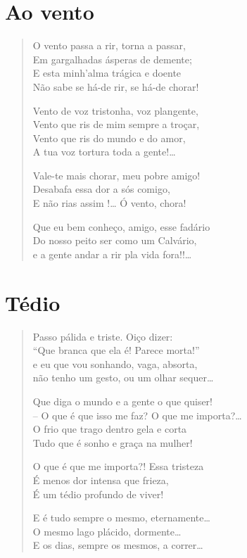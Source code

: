 \chapter{Ao vento}
\begin{verse}
O vento passa a rir, torna a passar,\\
Em gargalhadas ásperas de demente;\\
E esta minh’alma trágica e doente\\
Não sabe se há-de rir, se há-de chorar! 

Vento de voz tristonha, voz plangente,\\
Vento que ris de mim sempre a troçar,\\
Vento que ris do mundo e do amor,\\
A tua voz tortura toda a gente!\ldots{}

Vale-te mais chorar, meu pobre amigo!\\
Desabafa essa dor a sós comigo,\\
E não rias assim !\ldots{} Ó vento, chora!

Que eu bem conheço, amigo, esse fadário\\
Do nosso peito ser como um Calvário,\\
e a gente andar a rir pla vida fora!!\ldots{}
\end{verse}

\chapter{Tédio}

\begin{verse}
Passo pálida e triste. Oiço dizer:\\
“Que branca que ela é! Parece morta!”\\
e eu que vou sonhando, vaga, absorta,\\
não tenho um gesto, ou um olhar sequer\ldots{}

Que diga o mundo e a gente o que quiser!\\
– O que é que isso me faz? O que me importa?\ldots{}\\
O frio que trago dentro gela e corta\\
Tudo que é sonho e graça na mulher!

O que é que me importa?! Essa tristeza\\
É menos dor intensa que frieza,\\
É um tédio profundo de viver!

E é tudo sempre o mesmo, eternamente\ldots{}\\
O mesmo lago plácido, dormente\ldots{}\\
E os dias, sempre os mesmos, a correr\ldots{} 
\end{verse}

